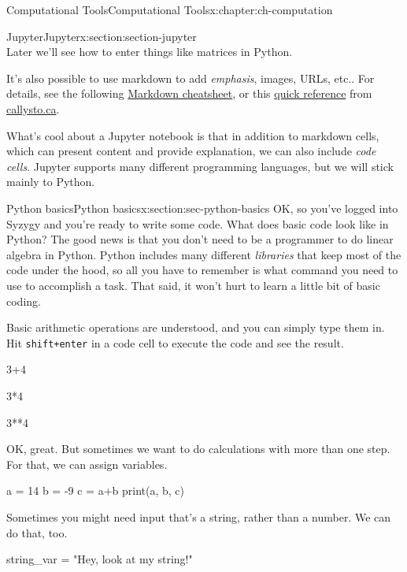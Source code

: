 \documentclass[oneside,10pt,]{book}
\newcommand{\mono}[1]{\texttt{#1}}
\numberwithin{equation}{section}
\begin{document}
\begin{chapterptx}{Computational Tools}{}{Computational Tools}{}{}{x:chapter:ch-computation}
\begin{sectionptx}{Jupyter}{}{Jupyter}{}{}{x:section:section-jupyter}
\begin{equation*}
\end{equation*}
Later we'll see how to enter things like matrices in Python.%
\par
It's also possible to use markdown to add \emph{emphasis}, images, URLs, etc.\@. For details, see the following \href{https://github.com/adam-p/markdown-here/wiki/Markdown-Cheatsheet}{Markdown cheatsheet}, or this \href{https://callysto.ca/wp-content/uploads/2018/12/Callysto-Cheatsheet_12.19.18_web.pdf}{quick reference} from \href{https://callysto.ca/}{callysto.ca}.%
\par
What's cool about a Jupyter notebook is that in addition to markdown cells, which can present content and provide explanation, we can also include \emph{code cells}. Jupyter supports many different programming languages, but we will stick mainly to Python.%
\end{sectionptx}
%
%
\typeout{************************************************}
\typeout{************************************************}
%
\begin{sectionptx}{Python basics}{}{Python basics}{}{}{x:section:sec-python-basics}
OK, so you've logged into Syzygy and you're ready to write some code. What does basic code look like in Python? The good news is that you don't need to be a programmer to do linear algebra in Python. Python includes many different \emph{libraries} that keep most of the code under the hood, so all you have to remember is what command you need to use to accomplish a task. That said, it won't hurt to learn a little bit of basic coding.%
\par
Basic arithmetic operations are understood, and you can simply type them in. Hit \mono{shift+enter} in a code cell to execute the code and see the result.%
\begin{sageinput}
3+4
\end{sageinput}
\begin{sageinput}
3*4
\end{sageinput}
\begin{sageinput}
3**4
\end{sageinput}
OK, great. But sometimes we want to do calculations with more than one step. For that, we can assign variables.%
\begin{sageinput}
a = 14
b = -9
c = a+b
print(a, b, c)
\end{sageinput}
Sometimes you might need input that's a string, rather than a number. We can do that, too.%
\begin{sageinput}
string_var = "Hey, look at my string!"

\end{sageinput}
\end{sectionptx}
\end{chapterptx}
\end{document}
